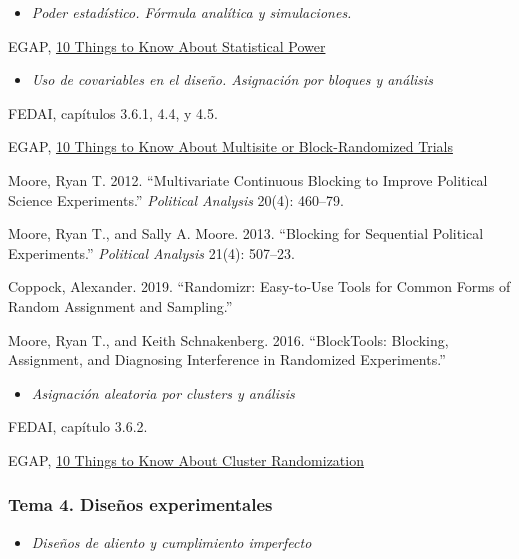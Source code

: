 \documentclass[
  12pt,
]{article}
\providecommand{\tightlist}{%
  \setlength{\itemsep}{0pt}\setlength{\parskip}{0pt}}
\begin{document}
\begin{itemize}
\tightlist
\item
  \emph{Poder estadístico. Fórmula analítica y simulaciones.}
\end{itemize}

EGAP,
\href{https://egap.org/resource/10-things-to-know-about-statistical-power/}{10
Things to Know About Statistical Power}

\begin{itemize}
\tightlist
\item
  \emph{Uso de covariables en el diseño. Asignación por bloques y
  análisis}
\end{itemize}

FEDAI, capítulos 3.6.1, 4.4, y 4.5.

EGAP,
\href{https://egap.org/resource/10-things-to-know-about-multisite-or-block-randomized-trials/}{10
Things to Know About Multisite or Block-Randomized Trials}

Moore, Ryan T. 2012. ``Multivariate Continuous Blocking to Improve
Political Science Experiments.'' \emph{Political Analysis} 20(4):
460--79.

Moore, Ryan T., and Sally A. Moore. 2013. ``Blocking for Sequential
Political Experiments.'' \emph{Political Analysis} 21(4): 507--23.

Coppock, Alexander. 2019. ``Randomizr: Easy-to-Use Tools for Common
Forms of Random Assignment and Sampling.''

Moore, Ryan T., and Keith Schnakenberg. 2016. ``BlockTools: Blocking,
Assignment, and Diagnosing Interference in Randomized Experiments.''

\begin{itemize}
\tightlist
\item
  \emph{Asignación aleatoria por clusters y análisis}
\end{itemize}

FEDAI, capítulo 3.6.2.

EGAP,
\href{https://egap.org/resource/10-things-to-know-about-cluster-randomization/}{10
Things to Know About Cluster Randomization}

\hypertarget{tema-4.-diseuxf1os-experimentales}{%
\subsubsection{Tema 4. Diseños
experimentales}\label{tema-4.-diseuxf1os-experimentales}}

\begin{itemize}
\tightlist
\item
  \emph{Diseños de aliento y cumplimiento imperfecto}
\end{itemize}
\end{document}
